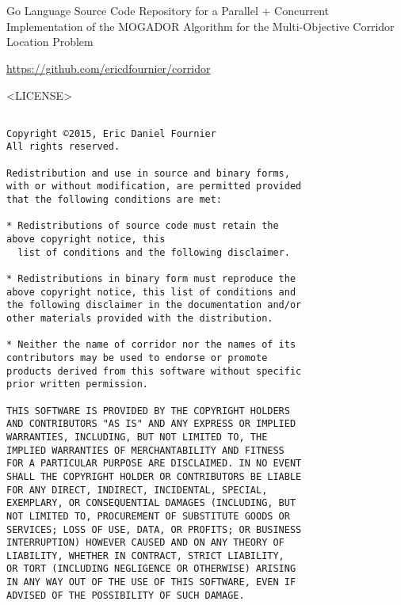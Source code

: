 \chapter{}
\label{A}

Go Language Source Code Repository for a Parallel + Concurrent Implementation of the MOGADOR Algorithm for the Multi-Objective Corridor Location Problem

\begin{center}
    
    \url{https://github.com/ericdfournier/corridor}
    
\end{center}

\newpage

<LICENSE>

\begin{lstlisting}[basicstyle=\small]

Copyright ©2015, Eric Daniel Fournier
All rights reserved.

Redistribution and use in source and binary forms,
with or without modification, are permitted provided 
that the following conditions are met:

* Redistributions of source code must retain the 
above copyright notice, this
  list of conditions and the following disclaimer.

* Redistributions in binary form must reproduce the 
above copyright notice, this list of conditions and 
the following disclaimer in the documentation and/or 
other materials provided with the distribution.

* Neither the name of corridor nor the names of its 
contributors may be used to endorse or promote 
products derived from this software without specific 
prior written permission.

THIS SOFTWARE IS PROVIDED BY THE COPYRIGHT HOLDERS 
AND CONTRIBUTORS "AS IS" AND ANY EXPRESS OR IMPLIED 
WARRANTIES, INCLUDING, BUT NOT LIMITED TO, THE
IMPLIED WARRANTIES OF MERCHANTABILITY AND FITNESS 
FOR A PARTICULAR PURPOSE ARE DISCLAIMED. IN NO EVENT 
SHALL THE COPYRIGHT HOLDER OR CONTRIBUTORS BE LIABLE
FOR ANY DIRECT, INDIRECT, INCIDENTAL, SPECIAL, 
EXEMPLARY, OR CONSEQUENTIAL DAMAGES (INCLUDING, BUT 
NOT LIMITED TO, PROCUREMENT OF SUBSTITUTE GOODS OR
SERVICES; LOSS OF USE, DATA, OR PROFITS; OR BUSINESS 
INTERRUPTION) HOWEVER CAUSED AND ON ANY THEORY OF 
LIABILITY, WHETHER IN CONTRACT, STRICT LIABILITY,
OR TORT (INCLUDING NEGLIGENCE OR OTHERWISE) ARISING 
IN ANY WAY OUT OF THE USE OF THIS SOFTWARE, EVEN IF 
ADVISED OF THE POSSIBILITY OF SUCH DAMAGE.

\end{lstlisting}

